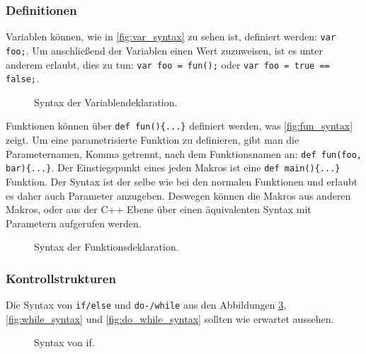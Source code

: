     \subsubsection{Definitionen}
    \label{sssec:Definitionen}
      Variablen können, wie in \autoref{fig:var_syntax} zu sehen ist, definiert werden: \lstinline[style=MyMacroStyle]$var foo;$. Um anschließend der Variablen einen Wert zuzuweisen, ist es unter anderem erlaubt, dies zu tun: \lstinline[style=MyMacroStyle]$var foo = fun();$ oder \lstinline[style=MyMacroStyle]$var foo = true == false;$.
      \begin{figure}[H]
        \centering
        \caption{Syntax der Variablendeklaration.}
        \label{fig:var_syntax}
      \end{figure}

      Funktionen können über \lstinline[style=MyMacroStyle]$def fun(){...}$ definiert werden, was \autoref{fig:fun_syntax} zeigt. Um eine parametrisierte Funktion zu definieren, gibt man die Parameternamen, Komma getrennt, nach dem Funktionsnamen an: \lstinline[style=MyMacroStyle]$def fun(foo, bar){...}$.
      Der Einstiegspunkt eines jeden Makros ist eine \lstinline[style=MyMacroStyle]$def main(){...}$ Funktion. Der Syntax ist der selbe wie bei den normalen Funktionen und erlaubt es daher auch Parameter anzugeben. Deswegen können die Makros aus anderen Makros, oder aus der C++ Ebene über einen äquivalenten Syntax mit Parametern aufgerufen werden.
      \begin{figure}[H]
        \centering
        \caption{Syntax der Funktionsdeklaration.}
        \label{fig:fun_syntax}
      \end{figure}

    \subsubsection{Kontrollstrukturen}
    \label{sssec:Kontrollstrukturen}
      Die Syntax von \lstinline[style=MyMacroStyle]$if/else$ und \lstinline[style=MyMacroStyle]$do-/while$ aus den Abbildungen \ref{fig:if_syntax}, \ref{fig:while_syntax} und \ref{fig:do_while_syntax} sollten wie erwartet aussehen.
      \begin{figure}[H]
        \centering
        \caption{Syntax von if.}
        \label{fig:if_syntax}
      \end{figure}

